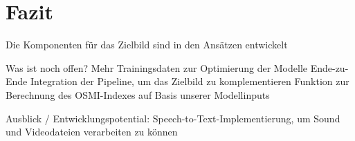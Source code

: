 \section{Fazit}
Die Komponenten für das Zielbild sind in den Ansätzen entwickelt

Was ist noch offen?
Mehr Trainingsdaten zur Optimierung der Modelle
Ende-zu-Ende Integration der Pipeline, um das Zielbild zu komplementieren
Funktion zur Berechnung des OSMI-Indexes auf Basis unserer Modellinputs

Ausblick  / Entwicklungspotential:
Speech-to-Text-Implementierung, um Sound und Videodateien verarbeiten zu können
